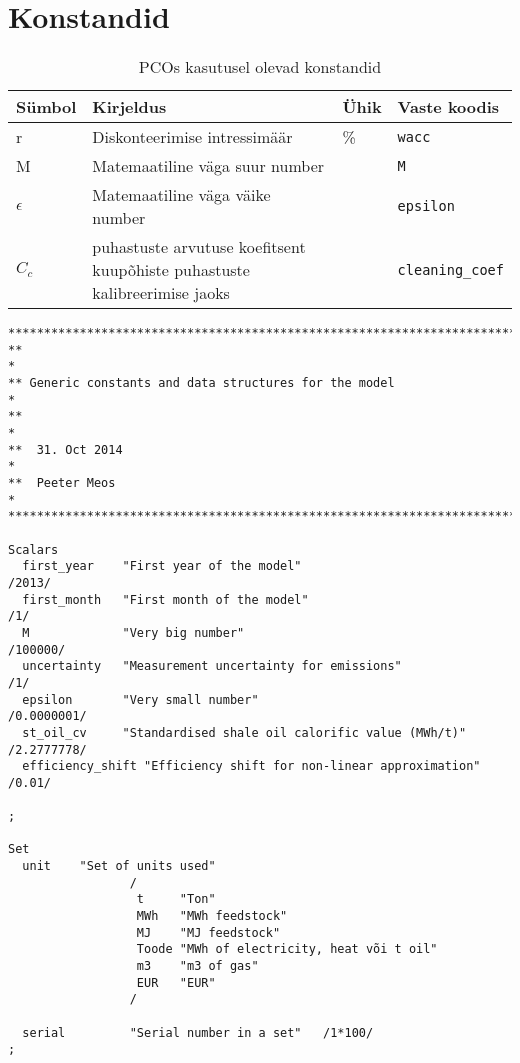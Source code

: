 \section{Konstandid}
\label{app:konstandid}

\begin{table}
\begin{tabular}{l l l l}
Sümbol & Kirjeldus & Ühik & Vaste koodis\\
\hline
r & Diskonteerimise intressimäär &  \%   & \texttt{wacc}  \\
M & Matemaatiline väga suur number & & \texttt{M} \\
$\epsilon$ & Matemaatiline väga väike number  & & \texttt{epsilon} \\
$C_c$ & puhastuste arvutuse koefitsent kuupõhiste puhastuste kalibreerimise jaoks & & \texttt{cleaning\_coef}  
\end{tabular}
\caption{PCOs kasutusel olevad konstandid}
\end{table}

\begin{verbatim}
********************************************************************************
**                                                                             *
** Generic constants and data structures for the model                         *
**                                                                             *
**  31. Oct 2014                                                               *
**  Peeter Meos                                                                *
********************************************************************************

Scalars
  first_year    "First year of the model"                             /2013/
  first_month   "First month of the model"                            /1/
  M             "Very big number"                                     /100000/
  uncertainty   "Measurement uncertainty for emissions"               /1/
  epsilon       "Very small number"                                   /0.0000001/
  st_oil_cv     "Standardised shale oil calorific value (MWh/t)"      /2.2777778/
  efficiency_shift "Efficiency shift for non-linear approximation"    /0.01/

;

Set
  unit    "Set of units used"
                 /
                  t     "Ton"
                  MWh   "MWh feedstock"
                  MJ    "MJ feedstock"
                  Toode "MWh of electricity, heat või t oil"
                  m3    "m3 of gas"
                  EUR   "EUR"
                 /

  serial         "Serial number in a set"   /1*100/
;
\end{verbatim}